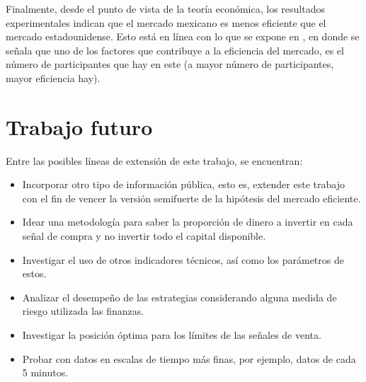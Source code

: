 \documentclass[12pt]{report}
\theoremstyle{break}
\theoremstyle{break}
\begin{document}
Finalmente, desde el punto de vista de la teoría económica, los resultados experimentales indican que el mercado mexicano es menos eficiente que el mercado estadounidense. Esto está en línea con lo que se expone en \cite{CFA2019}, en donde se señala que uno de los factores que contribuye a la eficiencia del mercado, es el número de participantes que hay en este (a mayor número de participantes, mayor eficiencia hay).

\section{Trabajo futuro}
\label{seccion:trabajo futuro}
Entre las posibles líneas de extensión de este trabajo, se encuentran:

\begin{itemize}
\item Incorporar otro tipo de información pública, esto es, extender este trabajo con el fin de vencer la versión semifuerte de la hipótesis del mercado eficiente.

\item Idear una metodología para saber la proporción de dinero a invertir en cada señal de compra y no invertir todo el capital disponible.

\item Investigar el uso de otros indicadores técnicos, así como los parámetros de estos.

\item Analizar el desempeño de las estrategias considerando alguna medida de riesgo utilizada las finanzas.

\item Investigar la posición óptima para los límites de las señales de venta.

\item Probar con datos en escalas de tiempo más finas, por ejemplo, datos de cada 5 minutos.
\end{itemize}




\nocite{Preen2010}
\nocite{Kuo2013}
\nocite{Wang2014}
\nocite{Hu2015} %
\end{document}
